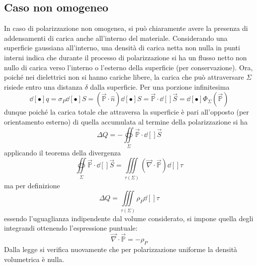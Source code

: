 \subsection{Caso non omogeneo}
In caso di polarizzazione non omogenea, si può chiaramente avere la presenza di addensamenti di carica anche all'interno del materiale. Considerando una superficie gaussiana all'interno, una densità di carica netta non nulla in punti interni indica che durante il processo di polarizzazione si ha un flusso netto non nullo di carica verso l'interno o l'esterno della superficie (per conservazione). Ora, poiché nei dielettrici non si hanno cariche libere, la carica che può attraversare $\Sigma$ risiede entro una distanza $\delta$ dalla superficie. Per una porzione infinitesima 
\[\dd[•]{q} = \sigma_P \dd[•]{S} = (\vec{\mathbb{P}} \cdot \hat{n}) \dd[•]{S} = \vec{\mathbb{P}} \cdot \dd[]{\vec{S}} = \dd[•]{\Phi}_\Sigma(\vec{\mathbb{P}})\]
dunque poiché la carica totale che attraversa la superficie è pari all'opposto (per orientamento esterno) di quella accumulata al termine della polarizzazione si ha
\[\Delta Q = - \oiint\limits_\Sigma \vec{\mathbb{P}} \cdot \dd[]{\vec{S}}\]
applicando il teorema della divergenza
\[\oiint\limits_\Sigma \vec{\mathbb{P}} \cdot \dd[]{\vec{S}} = \iiint\limits_{\tau(\Sigma)} (\vec{\nabla} \cdot \vec{\mathbb{P}}) \dd[]{\tau}\]
ma per definizione
\[\Delta Q = \iiint\limits_{\tau(\Sigma)} \rho_P \dd[]{\tau}\]
essendo l'uguaglianza indipendente dal volume considerato, si impone quella degli integrandi ottenendo l'espressione puntuale:
\[\vec{\nabla} \cdot \vec{\mathbb{P}} = - \rho_P\]
Dalla legge si verifica nuovamente che per polarizzazione uniforme la densità volumetrica è nulla.

